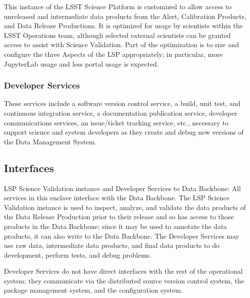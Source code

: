\documentclass[DM,toc,lsstdraft]{lsstdoc}
\begin{document}
This instance of the LSST Science Platform is customized to allow access
to unreleased and intermediate data products from the Alert, Calibration
Products, and Data Release Productions. It is optimized for usage by
scientists within the LSST Operations team, although selected external
scientists can be granted access to assist with Science Validation. Part
of the optimization is to size and configure the three Aspects of the
LSP appropriately; in particular, more JupyterLab usage and less portal
usage is expected.

\subsubsection{Developer Services}\label{developer-services}

These services include a software version control service, a build, unit test, and continuous integration service, a documentation publication service, developer communications services, an issue/ticket tracking service, etc., necessary to support science and system developers as they create and debug new versions of the Data Management System.

\subsection{Interfaces}\label{ncsa-development-integration-interfaces}

LSP Science Validation instance and Developer Services to Data Backbone:
All services in this enclave interface with the Data Backbone.  The LSP
Science Validation instance is used to inspect, analyze, and validate the data
products of the Data Release Production prior to their release and so has
access to those products in the Data Backbone; since it may be used to annotate
the data products, it can also write to the Data Backbone.  The Developer
Services may use raw data, intermediate data products, and final
data products to do development, perform tests, and debug problems.

Developer Services do not have direct interfaces with the rest of the
operational system; they communicate via the distributed source version control
system, the package management system, and the configuration system.







\end{document}
